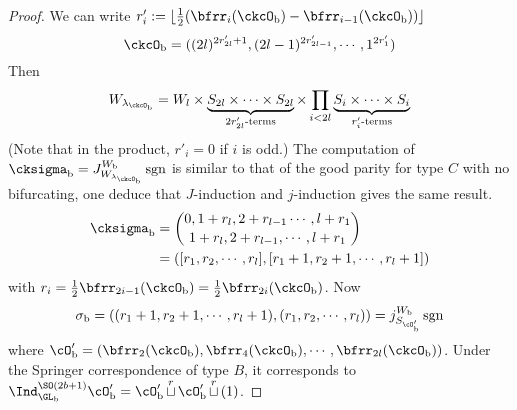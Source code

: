\documentclass[12pt,a4paper]{amsart}
\newcommand{\sgn}{\operatorname{sgn}}
\numberwithin{equation}{section}
\theoremstyle{remark}
\def\half{{\tfrac{1}{2}}}
\def\floor#1{{\lfloor #1 \rfloor}}
\def\lamckb{\lambda_{\ckcO_{\mathrm b}}}
\def\cuprow{{\stackrel{r}{\sqcup}}}
\def\cuprow{{\,\stackrel{r}{\sqcup}\,}}
\begin{document}
\begin{proof}
{{      We can write
      $r'_{i} := \floor{\half(\bfrr_{i}(\ckcO_{\mathrm b})-\bfrr_{i-1}(\ckcO_{\mathrm b}))}$
      \[
        \ckcO_{\mathrm b} %
        = ((2l)^{2r'_{2l}+1}, (2l-1)^{2r'_{2l-1}},\cdots, 1^{2r'_{1}})
      \]
      Then
      \[
        W_{\lamckb} = W_{l} \times \underbrace{S_{2l}\times \cdots \times S_{2l}}_{2r'_{2l}\text{-terms}} \times \prod_{i<2l} \underbrace{S_{i}\times \cdots\times S_{i}}_{r'_{i}\text{-terms}}
      \]
      (Note that in the product, $r'_{i}=0$ if $i$ is odd.) The computation of
      $\cksigma_{\mathrm b} = J_{W_{\lamckb}}^{W_{\mathrm b}} \sgn$ is similar to that of the
      good parity for type $C$ with no bifurcating, one deduce that
      $J$-induction and $j$-induction gives the same result.
      \[
        \begin{split}
          \cksigma_{\mathrm b} &=
          \binom{0, 1+r_{l}, 2+r_{l-1}\cdots, l+r_{1}}{1+r_{l},2+r_{l-1}, \cdots, l+r_{1}}\\
          & = ([r_{1},r_{2},\cdots, r_{l}],[r_{1}+1,r_{2}+1,\cdots,r_{l}+1])\\
        \end{split}
      \]
      with $r_{i} = \half\bfrr_{2i-1}(\ckcO_{\mathrm b}) = \half\bfrr_{2i}(\ckcO_{\mathrm b})$.
      Now
      \[
        \sigma_{\mathrm b} = ((r_{1}+1,r_{2}+1,\cdots,r_{l}+1), (r_{1},r_{2},\cdots, r_{l})) = j_{S_{\cO'_{\mathrm b}}}^{W_{\mathrm b}}\sgn
      \]
      where
      $\cO'_{\mathrm b}=(\bfrr_{2}(\ckcO_{\mathrm b}),\bfrr_{4}(\ckcO_{\mathrm b}),\cdots, \bfrr_{2l}(\ckcO_{\mathrm b}))$.
      Under the Springer correspondence of type $B$, it corresponds to
      $\Ind_{\GL_{\mathrm b}}^{\SO(2b+1)}\cO'_{\mathrm b} = \cO'_{\mathrm b}\cuprow \cO'_{\mathrm b}\cuprow (1)$.



}}
\end{proof}
\end{document}
